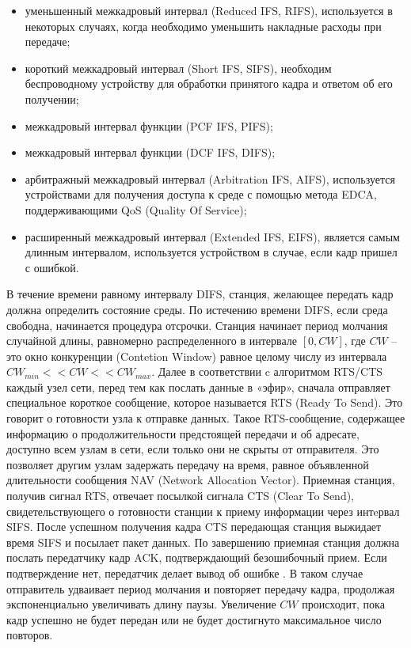 \begin{itemize}
  \item уменьшенный межкадровый интервал (Reduced IFS, RIFS), используется в некоторых случаях, когда необходимо уменьшить накладные расходы при передаче;
  \item короткий межкадровый интервал (Short IFS, SIFS), необходим беспроводному устройству для обработки принятого кадра и ответом об его получении;
  \item межкадровый интервал функции (PCF IFS, PIFS);
  \item межкадровый интервал функции (DCF IFS, DIFS);
  \item арбитражный межкадровый интервал (Arbitration IFS, AIFS), используется устройствами для получения доступа к среде с помощью метода EDCA, поддерживающими QoS (Quality Of Service);
  \item расширенный межкадровый интервал (Extended IFS, EIFS), является самым длинным интервалом, используется устройством в случае, если кадр пришел с ошибкой.
\end{itemize}

В течение времени равному интервалу DIFS, станция, желающее передать кадр должна определить состояние среды. По истечению времени DIFS, если среда свободна, начинается процедура отсрочки. Станция начинает период молчания случайной длины, равномерно распределенного в интервале $[0, CW]$, где $CW$ -- это окно конкуренции (Contetion Window) равное целому числу из интервала $CW_{min} << CW << CW_{max}$. Далее в соответствии c алгоритмом RTS/CTS каждый узел сети, перед тем как послать данные в «эфир», сначала отправляет специальное короткое сообщение, которое называется RTS (Ready To Send). Это говорит о готовности узла к отправке данных. Такое RTS-сообщение, содержащее информацию о продолжительности предстоящей передачи и об адресате, доступно всем узлам в сети, если только они не скрыты от отправителя. Это позволяет другим узлам задержать передачу на время, равное объявленной длительности сообщения NAV (Network Allocation Vector). Приемная станция, получив сигнал RTS, отвечает посылкой сигнала CTS (Clear To Send), свидетельствующего о готовности станции к приему информации через интeрвал SIFS. После успешном получения кадра CTS передающая станция выжидает время SIFS и посылает пакет данных. По завершению приемная станция должна послать передатчику кадр ACK, подтверждающий безошибочный прием. Если подтверждение нет, передатчик делает вывод об ошибке \cite{Tanenbaum2022}. В таком случае отправитель удваивает период молчания и повторяет передачу кадра, продолжая экспоненциально увеличивать длину паузы. Увеличение $CW$ происходит, пока кадр успешно не будет передан или не будет достигнуто максимальное число повторов.


